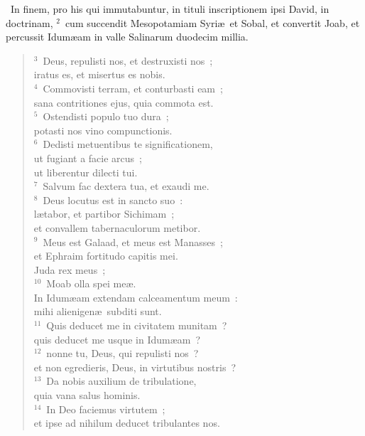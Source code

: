 ~\lettrine[lines=10,image=true,loversize=0.05,lraise=-0.03]{I}{}n finem, pro his qui immutabuntur, in tituli inscriptionem ipsi David, in doctrinam,
${}^{2}$~cum succendit Mesopotamiam Syri\ae\ et Sobal, et convertit Joab, et percussit Idum\ae am in valle Salinarum duodecim millia.
\begin{flushleft}\begin{verse}${}^{3}$~Deus, repulisti nos, et destruxisti nos~;\\ iratus es, et misertus es nobis.\\
${}^{4}$~Commovisti terram, et conturbasti eam~;\\ sana contritiones ejus, quia commota est.\\
${}^{5}$~Ostendisti populo tuo dura~;\\ potasti nos vino compunctionis.\\
${}^{6}$~Dedisti metuentibus te significationem,\\ ut fugiant a facie arcus~;\\ ut liberentur dilecti tui.\\
${}^{7}$~Salvum fac dextera tua, et exaudi me.\\
${}^{8}$~Deus locutus est in sancto suo~:\\ l\ae tabor, et partibor Sichimam~;\\ et convallem tabernaculorum metibor.\\
${}^{9}$~Meus est Galaad, et meus est Manasses~;\\ et Ephraim fortitudo capitis mei.\\ Juda rex meus~;\\
${}^{10}$~Moab olla spei me\ae .\\ In Idum\ae am extendam calceamentum meum~:\\ mihi alienigen\ae\ subditi sunt.\\
${}^{11}$~Quis deducet me in civitatem munitam~?\\ quis deducet me usque in Idum\ae am~?\\
${}^{12}$~nonne tu, Deus, qui repulisti nos~?\\ et non egredieris, Deus, in virtutibus nostris~?\\
${}^{13}$~Da nobis auxilium de tribulatione,\\ quia vana salus hominis.\\
${}^{14}$~In Deo faciemus virtutem~;\\ et ipse ad nihilum deducet tribulantes nos.\end{verse}\end{flushleft}


